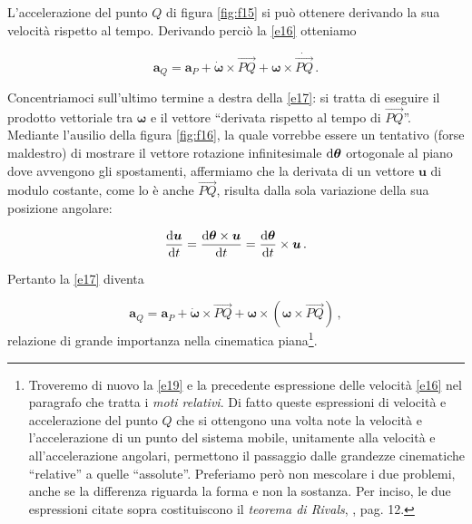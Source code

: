 L'accelerazione del punto $Q$ di figura \ref{fig:f15} si pu\`o ottenere
derivando la sua velocit\`a rispetto al tempo.
Derivando perci\`o la \ref{e16} otteniamo

\begin{equation}
	{  \bm{a}_{\scriptscriptstyle{Q}}} =
	{  \bm{a}_{\scriptscriptstyle{P}}} +
	\dot{\bm \omega} \times \overrightarrow{PQ}+
	{\bm \omega} \times \dot{{\overrightarrow{PQ}}}\,.
	\label{e17}
\end{equation}

\noindent Concentriamoci sull'ultimo termine
a destra della \ref{e17}: si tratta di eseguire il prodotto
vettoriale tra $\bm \omega$ e il vettore ``derivata rispetto
al tempo di $\overrightarrow{PQ}$''.
Mediante l'ausilio della figura \ref{fig:f16}, la quale vorrebbe essere un
tentativo (forse maldestro) di mostrare il vettore rotazione infinitesimale
${\rm d}{\bm \theta}$ ortogonale al piano dove avvengono gli spostamenti,
affermiamo che la  derivata di un vettore $\bm u$ di modulo costante, come lo \`e anche 
$\overrightarrow{PQ}$,
risulta dalla sola variazione della sua posizione angolare:

\begin{equation}
{{{\rm d}{\bm u}}\over{{\rm d}t}}=
{{\rm d}{\bm \theta} \times 
{\bm u}\over{{\rm d}t}}=
{{\rm d}{\bm \theta}
\over{{\rm d}t}} \times {\bm u}\,.
	\label{e18}
\end{equation}

\noindent Pertanto la \ref{e17} diventa

\begin{equation}
{{\bm a}_{\scriptscriptstyle{Q}}} =
{{\bm a}_{\scriptscriptstyle{P}}} +
\dot{\bm \omega} \times \overrightarrow{PQ}+
{\bm \omega}\times({\bm \omega} \times {{\overrightarrow{PQ}}})\,,
	\label{e19}
\end{equation}
\noindent relazione di grande importanza 
nella cinematica piana\footnote
{
Troveremo di nuovo la \ref{e19} 
e la precedente espressione delle velocit\`a \ref{e16}
nel paragrafo che tratta i {\em moti relativi}. Di fatto queste
espressioni di velocit\`a e accelerazione del punto $Q$ che si ottengono una
volta note la velocit\`a e l'accelerazione di un punto del sistema
mobile, unitamente alla
velocit\`a e all'accelerazione angolari, permettono
il passaggio dalle grandezze cinematiche ``relative'' a quelle ``assolute''.
 Preferiamo per\`o non
mescolare i due problemi, anche se la differenza riguarda la forma e non la sostanza. Per inciso,
le due espressioni citate sopra costituiscono il
{\em teorema di Rivals}, \cite{sesini1}, pag. 12.
}.	

